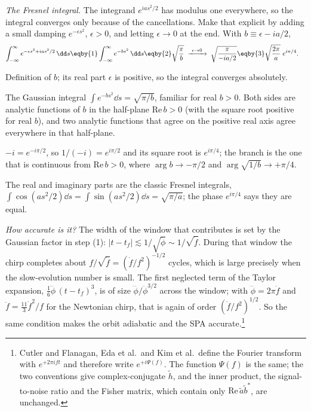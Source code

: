 \emph{The Fresnel integral.} The integrand $e^{ias^2/2}$ has modulus one everywhere, so the integral converges only because of the cancellations. Make that explicit by adding a small damping $e^{-\epsilon s^2}$, $\epsilon>0$, and letting $\epsilon\to0$ at the end. With $b\equiv\epsilon-ia/2$,
\begin{align}
  \int_{-\infty}^\infty e^{-\epsilon s^2+ias^2/2}\,\dd s
  &\eqby{1}\int_{-\infty}^\infty e^{-bs^2}\,\dd s
  \eqby{2}\sqrt{\frac\pi b}
  \;\xrightarrow{\ \epsilon\to0\ }\;
  \sqrt{\frac{\pi}{-ia/2}}
  \eqby{3}\sqrt{\frac{2\pi}{a}}\;e^{i\pi/4} .
  \label{T2g:eq:fresnel}
\end{align}
\begin{explain}
  \item Definition of $b$; its real part $\epsilon$ is positive, so the integral converges absolutely.
  \item The Gaussian integral $\int e^{-bs^2}\dd s=\sqrt{\pi/b}$, familiar for real $b>0$. Both sides are analytic functions of $b$ in the half-plane $\mathrm{Re}\,b>0$ (with the square root positive for real $b$), and two analytic functions that agree on the positive real axis agree everywhere in that half-plane.
  \item $-i=e^{-i\pi/2}$, so $1/(-i)=e^{i\pi/2}$ and its square root is $e^{i\pi/4}$; the branch is the one that is continuous from $\mathrm{Re}\,b>0$, where $\arg b\to-\pi/2$ and $\arg\sqrt{1/b}\to+\pi/4$.
\end{explain}
The real and imaginary parts are the classic Fresnel integrals, $\int\cos(as^2/2)\dd s=\int\sin(as^2/2)\dd s=\sqrt{\pi/a}$; the phase $e^{i\pi/4}$ says they are equal.

\emph{How accurate is it?} The width of the window that contributes is set by the Gaussian factor in step (1): $\lvert t-t_f\rvert\lesssim1/\sqrt{\ddot\phi}\sim1/\sqrt{\dot f}$. During that window the chirp completes about $f/\sqrt{\dot f}=(\dot f/f^2)^{-1/2}$ cycles, which is large precisely when the slow-evolution number is small. The first neglected term of the Taylor expansion, $\tfrac16\dddot\phi\,(t-t_f)^3$, is of size $\dddot\phi/\ddot\phi^{3/2}$ across the window; with $\dddot\phi=2\pi\ddot f$ and $\ddot f=\tfrac{11}{3}\dot f^2/f$ for the Newtonian chirp, that is again of order $(\dot f/f^2)^{1/2}$. So the same condition makes the orbit adiabatic and the SPA accurate.\footnote{Cutler and Flanagan, Eda et al.\ and Kim et al.\ define the Fourier transform with $e^{+2\pi ift}$ and therefore write $e^{+i\Psi(f)}$. The function $\Psi(f)$ is the same; the two conventions give complex-conjugate $\tilde h$, and the inner product, the signal-to-noise ratio and the Fisher matrix, which contain only $\mathrm{Re}\,\tilde a\tilde b^*$, are unchanged.}

